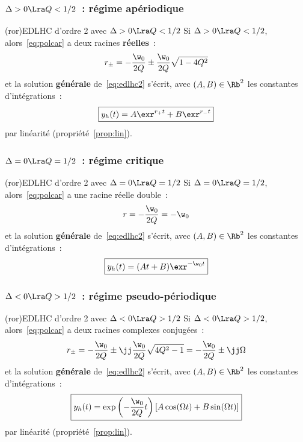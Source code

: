 \documentclass[a4paper, 11pt, garamond]{book}
\begin{document}
\subsubsection{$\Delta > 0 \Lra Q <1/2$~: régime apériodique}
\begin{tcn}(ror){EDLHC d'ordre 2 avec $\Delta > 0 \Lra Q <1/2$}
	Si $\Delta > 0 \Lra Q < 1/2$, alors~\eqref{eq:polcar} a deux racines
  \textbf{réelles}~:
	\[
		r_{\pm} = -\frac{\w_0}{2Q} \pm \frac{\w_0}{2Q} \sqrt{1-4Q^{2}}
	\]
	et la solution \textbf{générale} de~\eqref{eq:edlhc2} s'écrit, avec $(A,B) \in
		\Rb^{2}$ les constantes d'intégrations~:
	\[
		\boxed{y_h(t) = A\exr^{r_+t} + B\exr^{r_-t}}
	\]
	par linéarité (propriété~\ref{prop:lin}).
\end{tcn}

\subsubsection{$\Delta = 0 \Lra Q=1/2$~: régime critique}
\begin{tcn}(ror){EDLHC d'ordre 2 avec $\Delta = 0 \Lra Q=1/2$}
  Si $\Delta = 0 \Lra Q = 1/2$, alors~\eqref{eq:polcar} a une racine réelle
  double~:
	\[
		r = -\frac{\w_0}{2Q} = -\w_0
	\]
  et la solution \textbf{générale} de~\eqref{eq:edlhc2} s'écrit, avec $(A,B) \in
    \Rb^{2}$ les constantes d'intégrations~:
	\[
		\boxed{y_h(t) = (At + B)\exr^{-\w_0t}}
	\]
\end{tcn}

\subsubsection{$\Delta < 0 \Lra Q>1/2$~: régime pseudo-périodique}
\begin{tcn}(ror){EDLHC d'ordre 2 avec $\Delta < 0 \Lra Q>1/2$}
	Si $\Delta < 0 \Lra Q > 1/2$, alors~\eqref{eq:polcar} a deux racines complexes
	conjugées~:
	\[
		r_{\pm} =
		-\frac{\w_0}{2Q} \pm \jj \frac{\w_0}{2Q} \sqrt{4Q^{2}-1} =
		-\frac{\w_0}{2Q} \pm \jj \Omega
	\]
	et la solution \textbf{générale} de~\eqref{eq:edlhc2} s'écrit, avec $(A,B) \in
		\Rb^{2}$ les constantes d'intégrations~:
	\[
		\boxed{
			y_h(t) = \exp\left( -\frac{\w_0}{2Q}t \right)
			\left[A\cos(\Omega t) + B\sin(\Omega t)\right]
		}
	\]
	par linéarité (propriété~\ref{prop:lin}).
\end{tcn}
\end{document}

